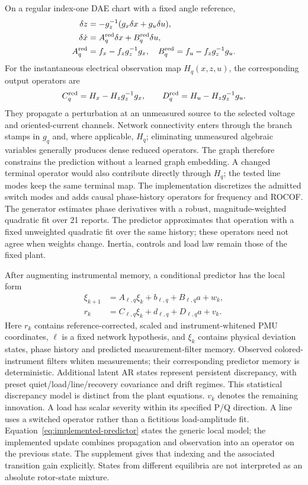 On a regular index-one DAE chart with a fixed angle reference,
\begin{align}
 \delta z&=-g_z^{-1}(g_x\delta x+g_u\delta u),\nonumber\\
 \delta\dot x&=A_q^{\rm red}\delta x+B_q^{\rm red}\delta u,\nonumber\\
 A_q^{\rm red}&=f_x-f_zg_z^{-1}g_x,\quad
 B_q^{\rm red}=f_u-f_zg_z^{-1}g_u.
 \label{eq:narrative-reduction}
\end{align}
For the instantaneous electrical observation map $H_q(x,z,u)$, the
corresponding output operators are
\begin{equation}
 C_q^{\rm red}=H_x-H_zg_z^{-1}g_x,\qquad
 D_q^{\rm red}=H_u-H_zg_z^{-1}g_u.
 \label{eq:electrical-output-reduction}
\end{equation}
They propagate a perturbation at an unmeasured source to the selected
voltage and oriented-current channels. Network connectivity enters through
the branch stamps in $g_q$ and, where applicable, $H_q$; eliminating unmeasured algebraic
variables generally produces dense reduced operators. The graph therefore
constrains the prediction without a learned graph embedding. A changed
terminal operator would also contribute directly through $H_q$; the
tested line modes keep the same terminal map. The implementation discretizes the admitted
switch modes and adds causal phase-history operators for frequency and
ROCOF. The generator estimates phase derivatives with a robust,
magnitude-weighted quadratic fit over 21 reports. The predictor approximates
that operation with a fixed unweighted quadratic fit over the same history;
these operators need not agree when weights change. Inertia, controls and
load law remain those of the fixed plant.

After augmenting instrumental memory, a conditional predictor has the
local form
\begin{align}
 \xi_{k+1}&=A_{\ell,q}\xi_k+b_{\ell,q}+B_{\ell,q}a+w_k,\nonumber\\
 r_k&=C_{\ell,q}\xi_k+d_{\ell,q}+D_{\ell,q}a+v_k.
 \label{eq:implemented-predictor}
\end{align}
Here $r_k$ contains reference-corrected, scaled and instrument-whitened PMU coordinates, $\ell$ is a fixed
network hypothesis, and $\xi_k$ contains physical deviation states, phase
history and predicted measurement-filter memory. Observed colored-instrument
filters whiten measurements; their corresponding predictor memory is
deterministic. Additional latent AR states represent persistent discrepancy,
with preset quiet/load/line/recovery covariance and drift regimes. This
statistical discrepancy model is distinct from the plant equations.
$v_k$ denotes the remaining innovation. A load has scalar severity within
its specified P/Q direction. A line uses a switched operator rather than
a fictitious load-amplitude fit. Equation~\eqref{eq:implemented-predictor} states the generic local model;
the implemented update combines propagation and observation into an
operator on the previous state. The supplement gives that indexing and
the associated transition gain explicitly. States from different equilibria are not
interpreted as an absolute rotor-state mixture.


